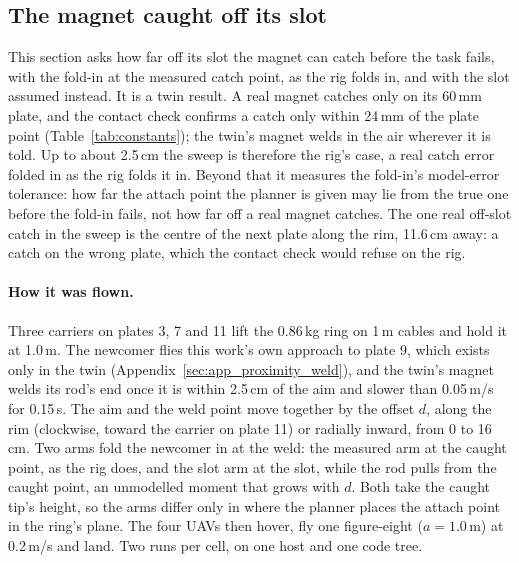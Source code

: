 \subsection{The magnet caught off its slot}
\label{sec:res_catch}

This section asks how far off its slot the magnet can catch before the task fails, with the fold-in at the measured
catch point, as the rig folds in, and with the slot assumed instead. It is a twin result. A real magnet catches only on
its 60\,mm plate, and the contact check confirms a catch only within 24\,mm of the plate point
(Table~\ref{tab:constants}); the twin's magnet welds in the air wherever it is told. Up to about 2.5\,cm the sweep is
therefore the rig's case, a real catch error folded in as the rig folds it in. Beyond that it measures the fold-in's
model-error tolerance: how far the attach point the planner is given may lie from the true one before the fold-in
fails, not how far off a real magnet catches. The one real off-slot catch in the sweep is the centre of the next plate
along the rim, 11.6\,cm away: a catch on the wrong plate, which the contact check would refuse on the rig.

\paragraph{How it was flown.} Three carriers on plates 3, 7 and 11 lift the 0.86\,kg ring on 1\,m cables and hold it at
1.0\,m. The newcomer flies this work's own approach to plate 9, which exists only in the twin
(Appendix~\ref{sec:app_proximity_weld}), and the twin's magnet welds its rod's end once it is within 2.5\,cm of the aim
and slower than 0.05\,m/s for 0.15\,s. The aim and the weld point move together by the offset $d$, along the rim
(clockwise, toward the carrier on plate 11) or radially inward, from 0 to 16\,cm. Two arms fold the newcomer in at the
weld: the measured arm at the caught point, as the rig does, and the slot arm at the slot, while the rod pulls from the
caught point, an unmodelled moment that grows with $d$. Both take the caught tip's height, so the arms differ only in
where the planner places the attach point in the ring's plane. The four UAVs then hover, fly one figure-eight
($a = 1.0$\,m) at 0.2\,m/s and land. Two runs per cell, on one host and one code tree.

